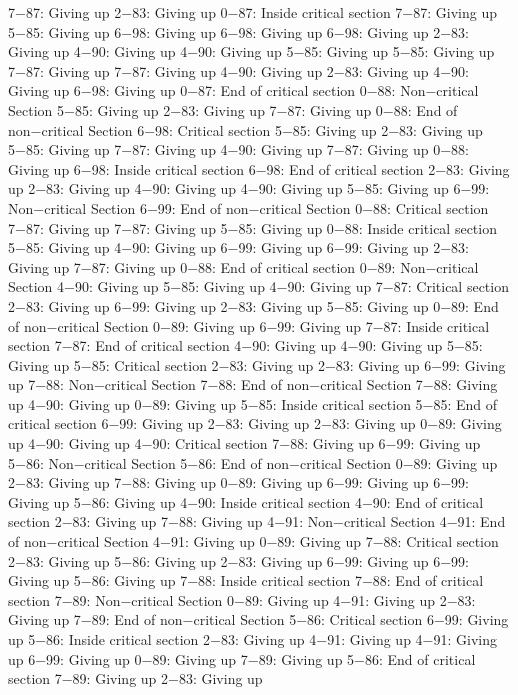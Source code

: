 7−87: Giving up
2−83: Giving up
0−87: Inside critical section
7−87: Giving up
5−85: Giving up
6−98: Giving up
6−98: Giving up
6−98: Giving up
2−83: Giving up
4−90: Giving up
4−90: Giving up
5−85: Giving up
5−85: Giving up
7−87: Giving up
7−87: Giving up
4−90: Giving up
2−83: Giving up
4−90: Giving up
6−98: Giving up
0−87: End of critical section
0−88: Non−critical Section
5−85: Giving up
2−83: Giving up
7−87: Giving up
0−88: End of non−critical Section
6−98: Critical section
5−85: Giving up
2−83: Giving up
5−85: Giving up
7−87: Giving up
4−90: Giving up
7−87: Giving up
0−88: Giving up
6−98: Inside critical section
6−98: End of critical section
2−83: Giving up
2−83: Giving up
4−90: Giving up
4−90: Giving up
5−85: Giving up
6−99: Non−critical Section
6−99: End of non−critical Section
0−88: Critical section
7−87: Giving up
7−87: Giving up
5−85: Giving up
0−88: Inside critical section
5−85: Giving up
4−90: Giving up
6−99: Giving up
6−99: Giving up
2−83: Giving up
7−87: Giving up
0−88: End of critical section
0−89: Non−critical Section
4−90: Giving up
5−85: Giving up
4−90: Giving up
7−87: Critical section
2−83: Giving up
6−99: Giving up
2−83: Giving up
5−85: Giving up
0−89: End of non−critical Section
0−89: Giving up
6−99: Giving up
7−87: Inside critical section
7−87: End of critical section
4−90: Giving up
4−90: Giving up
5−85: Giving up
5−85: Critical section
2−83: Giving up
2−83: Giving up
6−99: Giving up
7−88: Non−critical Section
7−88: End of non−critical Section
7−88: Giving up
4−90: Giving up
0−89: Giving up
5−85: Inside critical section
5−85: End of critical section
6−99: Giving up
2−83: Giving up
2−83: Giving up
0−89: Giving up
4−90: Giving up
4−90: Critical section
7−88: Giving up
6−99: Giving up
5−86: Non−critical Section
5−86: End of non−critical Section
0−89: Giving up
2−83: Giving up
7−88: Giving up
0−89: Giving up
6−99: Giving up
6−99: Giving up
5−86: Giving up
4−90: Inside critical section
4−90: End of critical section
2−83: Giving up
7−88: Giving up
4−91: Non−critical Section
4−91: End of non−critical Section
4−91: Giving up
0−89: Giving up
7−88: Critical section
2−83: Giving up
5−86: Giving up
2−83: Giving up
6−99: Giving up
6−99: Giving up
5−86: Giving up
7−88: Inside critical section
7−88: End of critical section
7−89: Non−critical Section
0−89: Giving up
4−91: Giving up
2−83: Giving up
7−89: End of non−critical Section
5−86: Critical section
6−99: Giving up
5−86: Inside critical section
2−83: Giving up
4−91: Giving up
4−91: Giving up
6−99: Giving up
0−89: Giving up
7−89: Giving up
5−86: End of critical section
7−89: Giving up
2−83: Giving up
